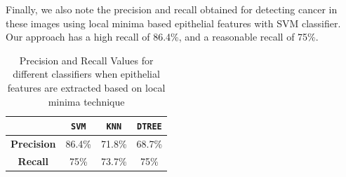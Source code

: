 Finally, we also note the precision and recall obtained for detecting cancer in these images using local minima based epithelial features with SVM classifier. Our approach has a high recall of 86.4\%, and a reasonable recall of 75\%.

\begin{table}
\centering
\begin{tabular}{|c|c|c|c| }
\hline
 & \textbf{\texttt{SVM}} & \textbf{\texttt{KNN}} & \textbf{\texttt{DTREE}} \\ \hline
\textbf{Precision} & 86.4\% & 71.8\% & 68.7\% \\ \hline
\textbf{Recall} & 75\% & 73.7\%  & 75\% \\ \hline
\end{tabular}
\caption{\label{table:PrecisionRecall}Precision and Recall Values for different classifiers when epithelial features are extracted based on local minima technique}
\end{table}
